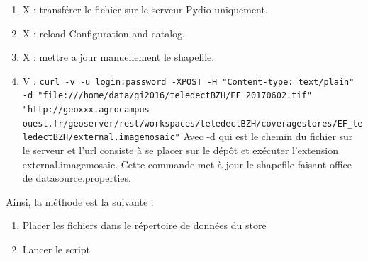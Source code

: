 \documentclass[10pt,a4paper]{article}
\begin{document}
\begin{enumerate}
\item X : transférer le fichier sur le serveur Pydio uniquement.
\item X : reload Configuration and catalog.
\item X : mettre a jour manuellement le shapefile.
\item V : \verb!curl -v -u login:password -XPOST -H "Content-type: text/plain" -d "file:///home/data/gi2016/teledectBZH/EF_20170602.tif" "http://geoxxx.agrocampus-ouest.fr/geoserver/rest/workspaces/teledectBZH/coveragestores/EF_teledectBZH/external.imagemosaic"! \smallbreak
Avec -d qui est le chemin du fichier sur le serveur et l'url consiste à se placer sur le dépôt et exécuter l'extension external.imagemosaic. Cette commande met à jour le shapefile faisant office de datasource.properties.
\end{enumerate}

Ainsi, la méthode est la suivante :
\begin{enumerate}
\item Placer les fichiers dans le répertoire de données du store
\item Lancer le script
\end{enumerate}
\end{document}
